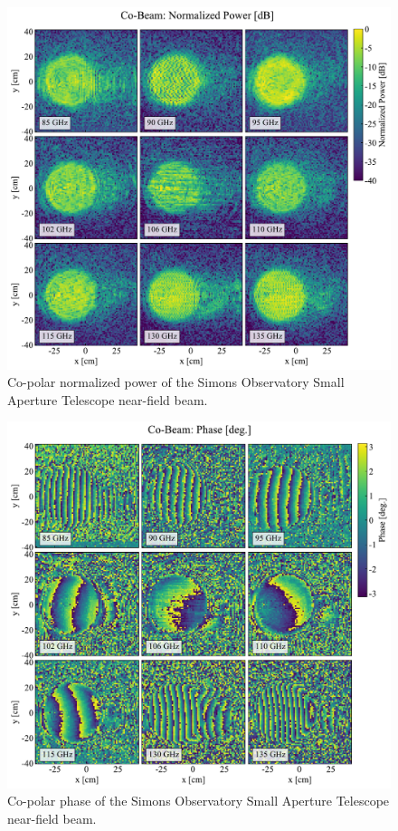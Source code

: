 \begin{figure}
    \centering
    \includegraphics[width = \textwidth]{Figures/SAT_MF1_co-beam.pdf}
    \caption{Co-polar normalized power of the Simons Observatory Small Aperture Telescope near-field beam.}
    \label{fig:sat_mf_cobeam}
\end{figure}

\begin{figure}
    \centering
    \includegraphics[width = \textwidth]{Figures/SAT_MF1_co-phase.pdf}
    \caption{Co-polar phase of the Simons Observatory Small Aperture Telescope near-field beam.}
    \label{fig:sat_mf_cophase}
\end{figure}

